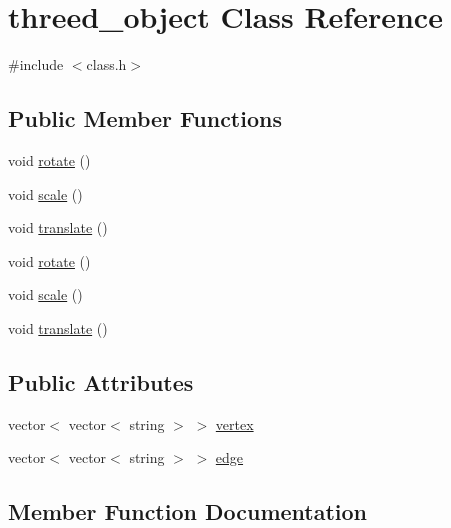 \hypertarget{classthreed__object}{}\section{threed\+\_\+object Class Reference}
\label{classthreed__object}


{\ttfamily \#include $<$class.\+h$>$}

\subsection*{Public Member Functions}
\begin{DoxyCompactItemize}
\item 
void \mbox{\hyperlink{classthreed__object_a0879b5b30f1005b7b5be1ffd61ad8bf1}{rotate}} ()
\item 
void \mbox{\hyperlink{classthreed__object_a615954daf5f2bf456f5753722c0580d4}{scale}} ()
\item 
void \mbox{\hyperlink{classthreed__object_a64de608ef1f9052f0dd9c9d434a7e099}{translate}} ()
\item 
void \mbox{\hyperlink{classthreed__object_a0879b5b30f1005b7b5be1ffd61ad8bf1}{rotate}} ()
\item 
void \mbox{\hyperlink{classthreed__object_a615954daf5f2bf456f5753722c0580d4}{scale}} ()
\item 
void \mbox{\hyperlink{classthreed__object_a64de608ef1f9052f0dd9c9d434a7e099}{translate}} ()
\end{DoxyCompactItemize}
\subsection*{Public Attributes}
\begin{DoxyCompactItemize}
\item 
vector$<$ vector$<$ string $>$ $>$ \mbox{\hyperlink{classthreed__object_aa5bbbe19ab4af6aedb71f4bf14b226c4}{vertex}}
\item 
vector$<$ vector$<$ string $>$ $>$ \mbox{\hyperlink{classthreed__object_abe2da0b2bc0bc21f1368a791ec4ab4cd}{edge}}
\end{DoxyCompactItemize}


\subsection{Member Function Documentation}
\mbox{\label{classthreed__object_a0879b5b30f1005b7b5be1ffd61ad8bf1}} 
